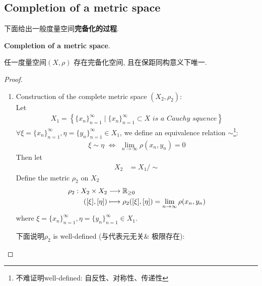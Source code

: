 \newpage

\subsection{Completion of a metric space}
	下面给出一般度量空间\textbf{完备化的过程}.
	\begin{thm}\label{thm 1.2.2}
		\textbf{Completion of a metric space}. 
		\begin{center}
			任一度量空间$(X , \rho)$ 存在完备化空间, 且在保距同构意义下唯一.
		\end{center}
		
		\vspace{4em}
		\begin{proof}
			\begin{enumerate}
				\item Construction of the complete metric space $(X_2 , \rho_2)$: \\
				Let
				\begin{align}
					X_1 = \left\{ \{ x_n \}_{n = 1}^{\infty} \mid \{ x_n \}_{n = 1}^{\infty} \subset X \,\, is \,\, a \,\, Cauchy \,\, squence \right\}
				\end{align}
				$\forall \xi = \{ x_n \}_{n = 1}^{\infty} , \eta = \{ y_n \}_{n = 1}^{\infty} \in X_1$, we define an equivalence relation $\sim$\footnote{不难证明well-defined: 自反性、对称性、传递性}:
				\begin{align}
					\xi \sim \eta \,\, \Leftrightarrow \,\, \lim_{n \to \infty}{\rho(x_n , y_n)} = 0
				\end{align}
				Then let
				\begin{align}
					X_2 &= X_1 / \sim 
				\end{align}
				Define the metric $\rho_2$ on $X_2$
				\begin{align}
					\rho_2 : X_2 \times X_2 &\longrightarrow \mathbb{R}_{\geq 0} \\
					([\xi] , [\eta]) &\longmapsto \rho_2([\xi] , [\eta]) = \lim_{n \to \infty}{\rho(x_n , y_n)}
				\end{align}
				where $\xi = \{ x_n \}_{n = 1}^{\infty} , \eta = \{ y_n \}_{n = 1}^{\infty} \in X_1$. 
				
				\vspace{1em}
				下面说明$\rho_2$ is well-defined (与代表元无关$\&$ 极限存在): 
				

\end{enumerate}
\end{proof}
\end{thm}
